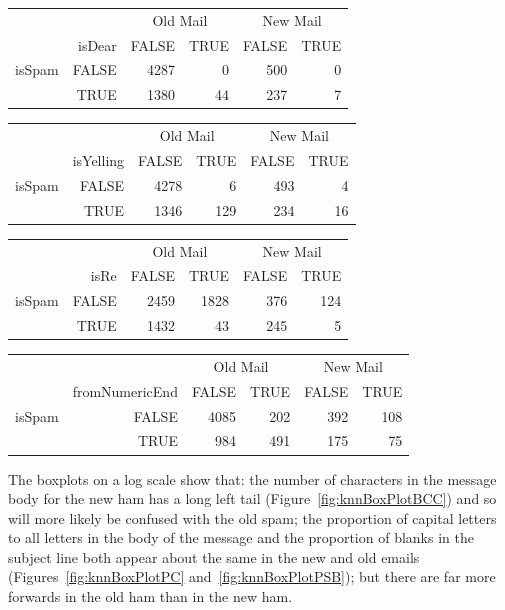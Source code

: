 \begin{table}
\begin{tabular}{rrrrrr}
       &  &  \multicolumn{2}{c}{Old Mail} & \multicolumn{2}{c}{New Mail} \\
       & isDear & FALSE & TRUE & FALSE & TRUE \\
isSpam & FALSE & 4287  &   0  & 500 &  0\\
       & TRUE  & 1380  &  44 & 237 & 7 \\
\end{tabular}
\end{table}

\begin{table}
\begin{tabular}{rrrrrr}
       &  &  \multicolumn{2}{c}{Old Mail} & \multicolumn{2}{c}{New Mail} \\
       & isYelling & FALSE & TRUE & FALSE & TRUE \\
isSpam & FALSE & 4278  &   6  & 493 &  4\\
       & TRUE  & 1346  &  129 & 234 & 16 \\
\end{tabular}
\end{table}

\begin{table}
\begin{tabular}{rrrrrr}
       &  &  \multicolumn{2}{c}{Old Mail} & \multicolumn{2}{c}{New Mail} \\
       & isRe & FALSE & TRUE & FALSE & TRUE \\
isSpam & FALSE & 2459  & 1828 & 376 & 124\\
       & TRUE  & 1432  &  43  & 245 &  5 \\
\end{tabular}
\end{table}

\begin{table}
\begin{tabular}{rrrrrr}
       &  &  \multicolumn{2}{c}{Old Mail} & \multicolumn{2}{c}{New Mail} \\
       & fromNumericEnd & FALSE & TRUE & FALSE & TRUE \\
isSpam & FALSE & 4085  & 202  & 392  & 108 \\
       & TRUE  & 984  &  491  & 175 &  75  \\
\end{tabular}
\end{table}

The boxplots on a log scale show that: the
number of characters in the message body for the 
new ham has a long left tail (Figure~\ref{fig:knnBoxPlotBCC})
and so will more likely be confused with the old spam;
the proportion of capital letters to all letters in the
body of the message and the proportion of blanks in the 
subject line both appear about the same
in the new and old emails (Figures~\ref{fig:knnBoxPlotPC}
and~\ref{fig:knnBoxPlotPSB});
but there are far more forwards in the old ham than in
the new ham. 

